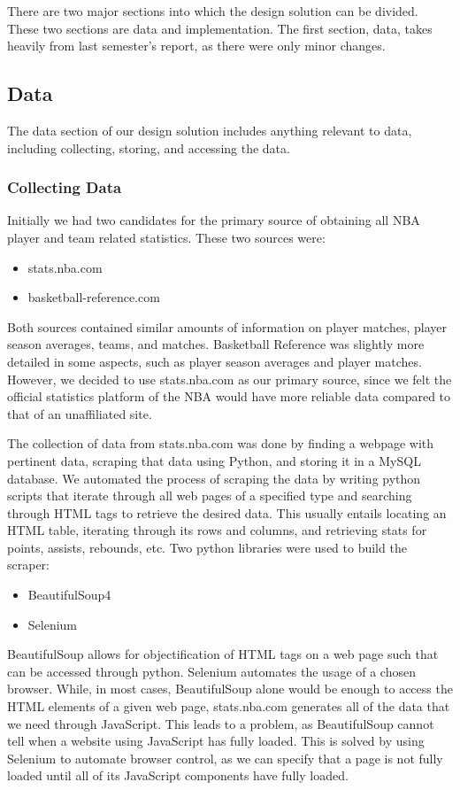There are two major sections into which the design solution can be divided. These two sections are data and implementation. The first section, data, takes heavily from last semester's report, as there were only minor changes. 

\subsection{Data}

The data section of our design solution includes anything relevant to data, including collecting, storing, and accessing the data.
\subsubsection{Collecting Data}
Initially we had two candidates for the primary source of obtaining all NBA player and team related statistics. These two sources were: 
\begin{itemize}
\item stats.nba.com
\item basketball-reference.com
\end{itemize}
Both sources contained similar amounts of information on player matches, player season averages, teams, and matches. Basketball Reference was slightly more detailed in some aspects, such as player season averages and player matches. However, we decided to use stats.nba.com as our primary source, since we felt the official statistics platform of the NBA would have more reliable data compared to that of an unaffiliated site.

The collection of data from stats.nba.com was done by finding a webpage with pertinent data, scraping that data using Python, and storing it in a MySQL database. We automated the process of scraping the data by writing python scripts that iterate through all web pages of a specified type and searching through HTML tags to retrieve the desired data. This usually entails locating an HTML table, iterating through its rows and columns, and retrieving stats for points, assists, rebounds, etc. Two python libraries were used to build the scraper:
\begin{itemize}
\item BeautifulSoup4
\item Selenium
\end{itemize}

BeautifulSoup allows for objectification of HTML tags on a web page such that can be accessed  through python. Selenium automates the usage of a chosen browser. While, in most cases, BeautifulSoup alone would be enough to access the HTML elements of a given web page, stats.nba.com generates all of the data that we need through JavaScript. This leads to a problem, as BeautifulSoup cannot tell when a website using JavaScript has fully loaded. This is solved by using Selenium to automate browser control, as we can specify that a page is not fully loaded until all of its JavaScript components have fully loaded.



